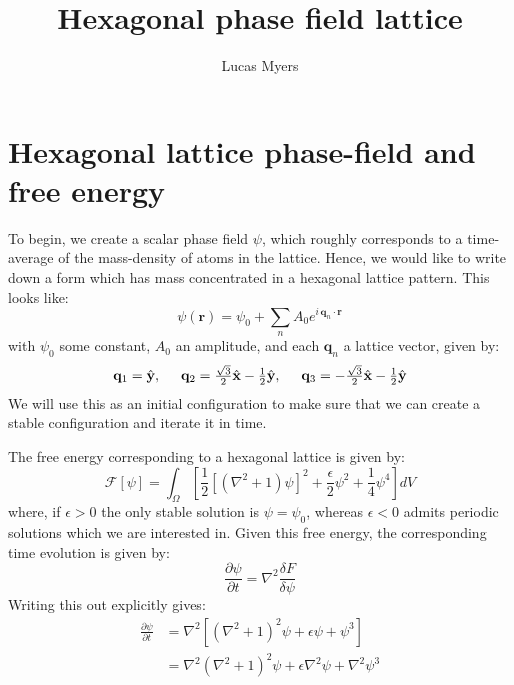 \documentclass[reqno]{article}
\begin{document}
\title{Hexagonal phase field lattice}
\author{Lucas Myers}
\maketitle

\section{Hexagonal lattice phase-field and free energy}
To begin, we create a scalar phase field $\psi$, which roughly corresponds to a time-average of the mass-density of atoms in the lattice.
Hence, we would like to write down a form which has mass concentrated in a hexagonal lattice pattern.
This looks like:
\begin{equation} \label{eq:hexagonal-lattice-configuration}
    \psi(\mathbf{r})
    =
    \psi_0
    +
    \sum_n A_0 e^{i \, \mathbf{q}_n \cdot \mathbf{r}}
\end{equation}
with $\psi_0$ some constant, $A_0$ an amplitude, and each $\mathbf{q}_n$ a lattice vector, given by:
\begin{equation}
    \mathbf{q}_1 = \hat{\mathbf{y}}, \hspace{0.5cm}
    \mathbf{q}_2 = \tfrac{\sqrt{3}}{2} \hat{\mathbf{x}} - \tfrac12 \hat{\mathbf{y}}, \hspace{0.5cm}
    \mathbf{q}_3 = -\tfrac{\sqrt{3}}{2} \hat{\mathbf{x}} - \tfrac12 \hat{\mathbf{y}}
\end{equation}
We will use this as an initial configuration to make sure that we can create a stable configuration and iterate it in time.

The free energy corresponding to a hexagonal lattice is given by:
\begin{equation}
    \mathcal{F}[\psi]
    =
    \int_\Omega \left[
    \frac12 \left[ \left(\nabla^2 + 1\right) \psi \right]^2
    + \frac{\epsilon}{2} \psi^2
    + \frac14 \psi^4
    \right] dV
\end{equation}
where, if $\epsilon > 0$ the only stable solution is $\psi = \psi_0$, whereas $\epsilon < 0$ admits periodic solutions which we are interested in.
Given this free energy, the corresponding time evolution is given by:
\begin{equation}
    \frac{\partial \psi}{\partial t}
    =
    \nabla^2 \frac{\delta F}{\delta \psi}
\end{equation}
Writing this out explicitly gives:
\begin{equation}
\begin{split}
    \frac{\partial \psi}{\partial t}
    &=
    \nabla^2 \left[\left(\nabla^2 + 1\right)^2 \psi
    + \epsilon \psi
    + \psi^3
    \right] \\
    &=
    \nabla^2 \left(\nabla^2 + 1 \right)^2 \psi
    + \epsilon \nabla^2 \psi
    + \nabla^2 \psi^3
\end{split}
\end{equation}
\end{document}
